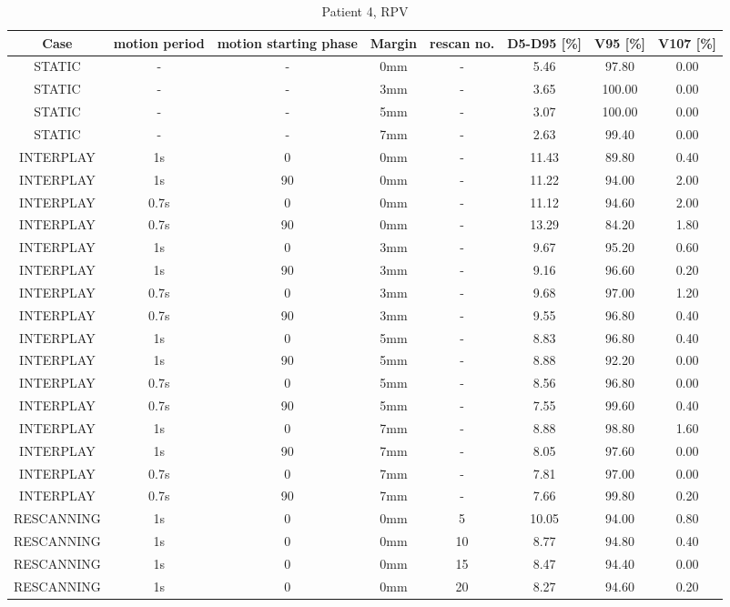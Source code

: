 \begin{table}[H]
  \centering
  \tiny
  \caption{Patient 4, RPV}
  \begin{tabular}{|c||c|c|c|c||c|c|c|}
    \hline\hline
    Case & motion period & motion starting phase & Margin & rescan no. & D5-D95 [\%] & V95 [\%] & V107 [\%] \\
    \hline 
STATIC & - & - & 0mm & - & 5.46 & 97.80 & 0.00 \\
STATIC & - & - & 3mm & - & 3.65 & 100.00 & 0.00 \\
STATIC & - & - & 5mm & - & 3.07 & 100.00 & 0.00 \\
STATIC & - & - & 7mm & - & 2.63 & 99.40 & 0.00 \\
INTERPLAY & 1s & 0 & 0mm & - & 11.43 & 89.80 & 0.40 \\
INTERPLAY & 1s & 90 & 0mm & - & 11.22 & 94.00 & 2.00 \\
INTERPLAY & 0.7s & 0 & 0mm & - & 11.12 & 94.60 & 2.00 \\
INTERPLAY & 0.7s & 90 & 0mm & - & 13.29 & 84.20 & 1.80 \\
INTERPLAY & 1s & 0 & 3mm & - & 9.67 & 95.20 & 0.60 \\
INTERPLAY & 1s & 90 & 3mm & - & 9.16 & 96.60 & 0.20 \\
INTERPLAY & 0.7s & 0 & 3mm & - & 9.68 & 97.00 & 1.20 \\
INTERPLAY & 0.7s & 90 & 3mm & - & 9.55 & 96.80 & 0.40 \\
INTERPLAY & 1s & 0 & 5mm & - & 8.83 & 96.80 & 0.40 \\
INTERPLAY & 1s & 90 & 5mm & - & 8.88 & 92.20 & 0.00 \\
INTERPLAY & 0.7s & 0 & 5mm & - & 8.56 & 96.80 & 0.00 \\
INTERPLAY & 0.7s & 90 & 5mm & - & 7.55 & 99.60 & 0.40 \\
INTERPLAY & 1s & 0 & 7mm & - & 8.88 & 98.80 & 1.60 \\
INTERPLAY & 1s & 90 & 7mm & - & 8.05 & 97.60 & 0.00 \\
INTERPLAY & 0.7s & 0 & 7mm & - & 7.81 & 97.00 & 0.00 \\
INTERPLAY & 0.7s & 90 & 7mm & - & 7.66 & 99.80 & 0.20 \\
RESCANNING & 1s & 0 & 0mm & 5 & 10.05 & 94.00 & 0.80 \\
RESCANNING & 1s & 0 & 0mm & 10 & 8.77 & 94.80 & 0.40 \\
RESCANNING & 1s & 0 & 0mm & 15 & 8.47 & 94.40 & 0.00 \\
RESCANNING & 1s & 0 & 0mm & 20 & 8.27 & 94.60 & 0.20 \\

\end{tabular}
\end{table}
